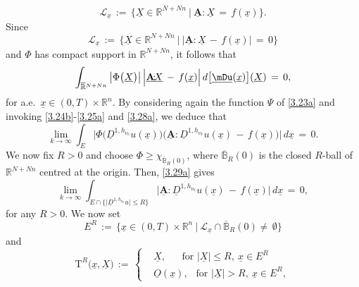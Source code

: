 \documentclass{amsart}
\theoremstyle{definition}
\numberwithin{equation}{section}
\begin{document}
\[
\mathscr{L}_{ \underline{x} }\, :=\, \Big\{ \underline{X} \in {\mathbb{R}}^{N+Nn}\ \Big| \ {\underline{\textbf{A}}}{\!:\!}\underline{X}\,=\,f(\underline{x}) \Big\}.
\]
Since
\[
\mathscr{L}_{ \underline{x} }\, :=\, \Big\{ \underline{X} \in {\mathbb{R}}^{N+Nn}\ \Big| \ \big|{\underline{\textbf{A}}}{\!:\!}\underline{X}\,-\,f(\underline{x})\big|\,=\,0 \Big\}
\]
and $\Phi $ has compact support in ${\mathbb{R}}^{N+Nn}$, it follows that 
\begin{equation} \label{3.28a}
\int_{ \smash{\overline{\mathbb{R}}}^{N+Nn} }  \big|\Phi\big( \underline{X} \big)\big|\, \Big| {\underline{\textbf{A}}} {\!:\!}  \underline{X}\,-\, f(\underline{x})  \Big|  \, d\big[\underline\mDu(\underline{x})\big]( \underline{X} )\,=\,0,
\end{equation}
for a.e.\ $\underline{x}\in (0,T)\! {\times} {\mathbb{R}}^n$. By considering again the function $\Psi$ of \eqref{3.23a} and invoking \eqref{3.24b}-\eqref{3.25a} and \eqref{3.28a}, we deduce that
\begin{equation}  \label{3.29a}
\lim_{k{\rightarrow} \infty} \int_E  \Big|\Phi\big( {\underline{D}}^{1,h_{\nu_k}}u(\underline{x})\big)\Big( {\underline{\textbf{A}}} {\!:\!} {\underline{D}}^{1,h_{\nu_k}}u(\underline{x})\,-\, f(\underline{x}) \Big) \Big|\,d\underline{x}\, =\, 0.
\end{equation}
We now fix $R>0$ and choose $\Phi  \geq \chi_{\overline{\mathbb{B}}_R(0)}$, where $\overline{\mathbb{B}}_R(0)$ is the closed $R$-ball of ${\mathbb{R}}^{N+Nn}$ centred at the origin. Then,  \eqref{3.29a} gives
\begin{equation}  \label{3.30a}
\lim_{k{\rightarrow} \infty} \int_{E\cap \big\{ \big| {\underline{D}}^{1,h_{\nu_k}}u  \big|\leq R\big\}}  \Big|  {\underline{\textbf{A}}} {\!:\!} {\underline{D}}^{1,h_{\nu_k}}u(\underline{x})\,-\, f (\underline{x}) \Big|\,d\underline{x}\, =\, 0,
\end{equation}
for any $R>0$. We now set
\[
E^R\,:=\, \Big\{ \underline{x} \in (0,T) {\times} {\mathbb{R}}^n \ \Big|\ \mathscr{L}_{\underline{x}} \cap \overline{\mathbb{B}}_R(0) \neq \,\emptyset \Big\}
\]
and 
\begin{equation}   \label{3.31a}
\text{T}^R\big(\underline{x},\underline{X}\big)\, :=\, 
\left\{
\begin{split}
& \underline{X}, \ \ \ \ \ \, \text{ for } \big|\underline{X} \big|\leq R ,\ \underline{x} \in E^R\\
& \underline{O}(\underline{x}),\ \  \text{ for } \big|\underline{X} \big|> R ,\ \underline{x} \in E^R,
\end{split}
\right.
\end{equation}
\end{document}
